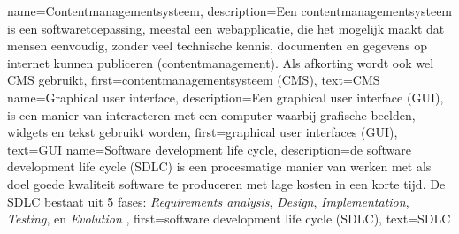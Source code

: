 \makenoidxglossaries

{
	name={Contentmanagementsysteem},
	description={Een contentmanagementsysteem is een softwaretoepassing,
			meestal een webapplicatie, die het mogelijk maakt dat mensen eenvoudig, zonder veel technische kennis,
			documenten en gegevens op internet kunnen publiceren (contentmanagement).
			Als afkorting wordt ook wel CMS gebruikt},
	first={contentmanagementsysteem (CMS)},
	text={CMS}
}
{
	name={Graphical user interface},
	description={Een graphical user interface (GUI), is een manier van interacteren met een computer waarbij grafische beelden, widgets en tekst gebruikt worden},
	first={graphical user interfaces (GUI)},
	text={GUI}
}
{
	name={Software development life cycle},
	description={de software development life cycle (SDLC) is een procesmatige manier van werken met als doel goede kwaliteit software te produceren met lage kosten in een korte tijd.
			De SDLC bestaat uit 5 fases: \textit{Requirements analysis}, \textit{Design}, \textit{Implementation}, \textit{Testing}, en \textit{Evolution} \Parencite{SDLC}},
	first={software development life cycle (SDLC)},
	text={SDLC}
}
